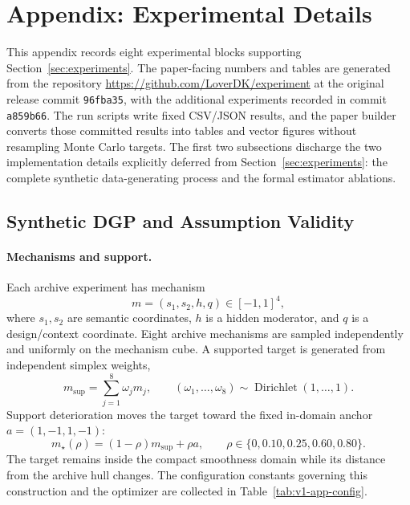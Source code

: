 \documentclass[11pt]{article}
\numberwithin{equation}{section}
\newcommand{\1}{\mathbf 1}
\begin{document}
\section{Appendix: Experimental Details}
\label{app:experiments}

This appendix records eight experimental blocks supporting Section~\ref{sec:experiments}.  The paper-facing numbers and tables are generated from the repository \url{https://github.com/LoverDK/experiment} at the original release commit \texttt{96fba35}, with the additional experiments recorded in commit \texttt{a859b66}.  The run scripts write fixed CSV/JSON results, and the paper builder converts those committed results into tables and vector figures without resampling Monte Carlo targets.  The first two subsections discharge the two implementation details explicitly deferred from Section~\ref{sec:experiments}: the complete synthetic data-generating process and the formal estimator ablations.

\subsection{Synthetic DGP and Assumption Validity}
\label{app:synthetic-dgp}
\suppressfloats[t]

\paragraph{Mechanisms and support.}
Each archive experiment has mechanism
\[
  m=(s_1,s_2,h,q)\in[-1,1]^4,
\]
where $s_1,s_2$ are semantic coordinates, $h$ is a hidden moderator, and $q$ is a design/context coordinate.  Eight archive mechanisms are sampled independently and uniformly on the mechanism cube.  A supported target is generated from independent simplex weights,
\[
  m_{\mathrm{sup}}=\sum_{j=1}^{8}\omega_jm_j,
  \qquad
  (\omega_1,\ldots,\omega_8)\sim\operatorname{Dirichlet}(1,\ldots,1).
\]
Support deterioration moves the target toward the fixed in-domain anchor $a=(1,-1,1,-1)$:
\[
  m_\star(\rho)=(1-\rho)m_{\mathrm{sup}}+\rho a,
  \qquad \rho\in\{0,0.10,0.25,0.60,0.80\}.
\]
The target remains inside the compact smoothness domain while its distance from the archive hull changes. The configuration constants governing this construction and the optimizer are collected in Table~\ref{tab:v1-app-config}.
\end{document}
